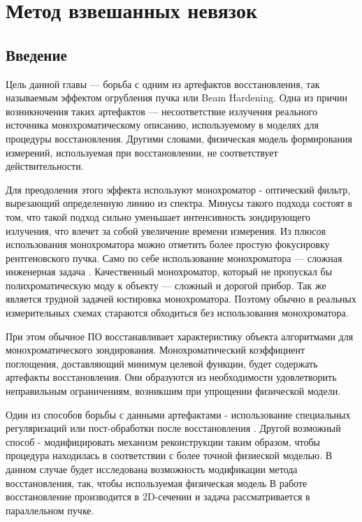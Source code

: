 \chapter{Метод взвешанных невязок} \label{chapt3}
\section{Введение}

Цель данной главы --- борьба с одним из артефактов восстановления, так называемым эффектом огрубления пучка или Beam Hardening. 
Одна из причин возникночения таких артефактов --- несоответствие излучения реального источника монохроматическому описанию, используемому в моделях для процедуры восстановления.
Другими словами, физическая модель формирования измерений, используемая при восстановлении, не соответствует действительности.

Для преодоления этого эффекта используют монохроматор - оптический фильтр, вырезающий определенную линию из спектра.
Минусы такого подхода состоят в том, что такой подход сильно уменьшает интенсивность зондирующего излучения, что влечет за собой увеличение времени измерения.
Из плюсов использования монохроматора можно отметить более простую фокусировку рентгеновского пучка.
Само по себе использование монохроматора --- сложная инженерная задача \cite{chukalina2014xray}. 
Качественный монохроматор, который не пропускал бы полихроматическую моду к объекту --- сложный и дорогой прибор. 
Так же является трудной задачей юстировка монохроматора.
Поэтому обычно в реальных измерительных схемах стараются обходиться без использования монохроматора.

При этом обычное ПО восстанавливает характеристику объекта алгоритмами для монохроматического зондирования.
Монохроматический коэффициент поглощения, доставляющий минимум целевой функции, будет содержать артефакты восстановления.
Они образуются из необходимости удовлетворить неправильным ограничениям, возникшим при упрощении физической модели.

Один из способов борьбы с данными артефактами - использование специальных регуляризаций или пост-обработки после восстановления \cite{van2011iterative}.
Другой возможный способ - модифицировать механизм реконструкции таким образом, чтобы процедура находилась в соответствии с более точной физиеской моделью.
В данном случае будет исследована возможность модификации метода восстановления, так, чтобы используемая физическая модель 
В работе восстановление производится в 2D-сечении и задача рассматривается в параллельном пучке.



